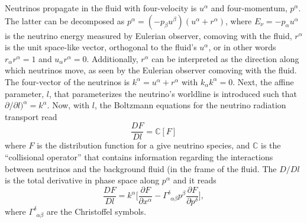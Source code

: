 Neutrinos propagate in the fluid with four-velocity is $u^{\alpha}$ and four-momentum, $p^{\alpha}$.
The latter can be decomposed as \citep{Thorne:1981}
%
$p^{\alpha} = (-p_{\beta}u^{\beta})(u^{\alpha} + r^{\alpha})$, 
%
where $E_{\nu}=-p_{\alpha}u^{\alpha}$ is the neutrino energy measured by Eulerian observer,
comoving with the fluid, $r^{\alpha}$ is the unit space-like vector, orthogonal to the 
fluid's $u^{\alpha}$, or in other words $r_{\alpha}r^{\alpha}=1$ and $u_{\alpha}r^{\alpha}=0$.
%
Additionally, $r^{\alpha}$ can be interpreted as the direction along which neutrinos move,
as seen by the Eulerian observer comoving with the fluid.
%
The four-vector of the neutrinos is
%
$k^{\alpha} = u^{\alpha} + r^{\alpha}$ 
%
with $k_{\alpha}k^{\alpha} = 0$.
%
Next, the affine parameter, $l$, that parameterizes the neutrino's worldline is introduced
%
% 
such that $\partial / \partial l)^{\alpha} = k^{\alpha}$.
%
Now, with $l$, the Boltzmann equations for the neutrino radiation transport read \citep{Thorne:1981}
%
\begin{equation*}
\frac{D F}{D l} = \mathbb{C}[F]
\end{equation*}
%
where $F$ is the distribution function for a give neutrino species, and $\mathbb{C}$ is the
``collisional operator'' that contains information regarding the interactions 
between neutrinos and the background fluid (in the frame of the fluid. 
%
The $D/Dl$ is the total derivative in phase space along $p^{\alpha}$ and it reads 
%
\begin{equation}
\label{eq:method:whisky:neut:bolzeq}
\frac{DF}{Dl} = k^{\alpha} \Big[ \frac{\partial F}{\partial x^{\alpha}} - \Gamma^{\delta}_{\:\:\alpha\beta}p^{\beta}\frac{\partial F}{\partial p^{\delta}} \Big],
\end{equation}
%
where $\Gamma^{\delta}_{\:\:\alpha\beta}$ are the Christoffel symbols.
%


